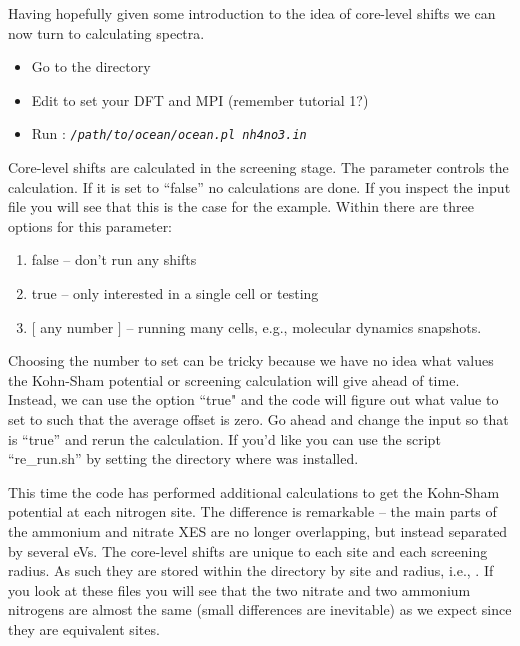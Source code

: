 \documentclass[11pt]{report}
\begin{document}
Having hopefully given some introduction to the idea of core-level shifts we can now turn to calculating spectra. 
\begin{itemize}
\item Go to the  directory
\item Edit  to set your DFT and MPI (remember tutorial 1?)
\item Run :  \texttt{\textsl{/path/to/ocean/ocean.pl nh4no3.in}}
\end{itemize} 
%
%
%
%
Core-level shifts are calculated in the screening stage. The parameter  controls the calculation. If it is set to ``false'' no calculations are done. If you inspect the  input file you will see that this is the case for the example. Within  there are three options for this parameter:
\begin{enumerate}
\item false -- don't run any shifts
\item true -- only interested in a single cell or testing
\item $[$ any number $]$ -- running many cells, e.g., molecular dynamics snapshots.
\end{enumerate}
Choosing the number to set  can be tricky because we have no idea what values the Kohn-Sham potential or screening calculation will give ahead of time. Instead, we can use the option ``true" and the code will figure out what value to set  to such that the average offset is zero. Go ahead and change the input so that  is ``true'' and rerun the calculation. If you'd like you can use the script ``re\_run.sh'' by setting the directory where  was installed. 

This time the code has performed additional calculations to get the Kohn-Sham potential at each nitrogen site. The difference is remarkable -- the main parts of the ammonium and nitrate XES are no longer overlapping, but instead separated by several eVs. The core-level shifts are unique to each site and each screening radius. As such they are stored within the  directory by site and radius, i.e., . If you look at these files you will see that the two nitrate and two ammonium nitrogens are almost the same (small differences are inevitable) as we expect since they are equivalent sites. 
\end{document}
